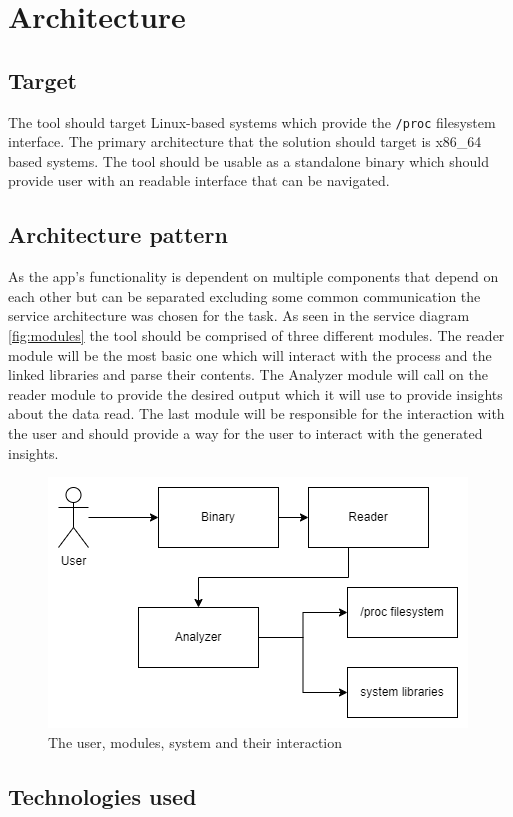 \section{Architecture}
\label{sec:architecture}

\subsection{Target}

The tool should target Linux-based systems which provide the \verb|/proc| filesystem interface. 
The primary architecture that the solution should target is x86\_64 based systems.
The tool should be usable as a standalone binary which should provide user with an readable interface that can be navigated.

\subsection{Architecture pattern}

As the app's functionality is dependent on multiple components that depend on each other but can be separated excluding some common communication the service architecture was chosen for the task.
As seen in the service diagram \autoref{fig:modules} the tool should be comprised of three different modules.
The reader module will be the most basic one which will interact with the process and the linked libraries and parse their contents. The Analyzer module will call on the reader module to provide the desired output which it will use to provide insights about the data read. The last module will be responsible for the interaction with the user and should provide a way for the user to interact with the generated insights.

\begin{figure}
    \centering
    \includegraphics[width=0.5\linewidth]{modules.drawio.png}
    \caption{The user, modules, system and their interaction}
    \label{fig:modules}
\end{figure}

\subsection{Technologies used}

